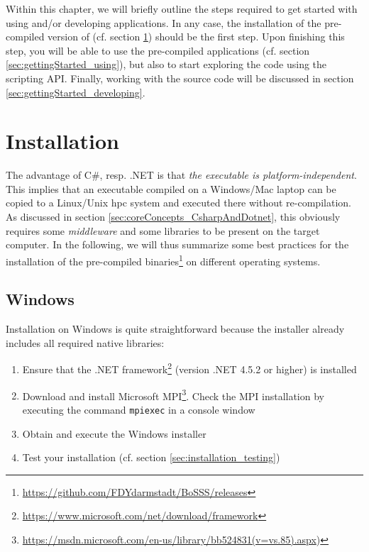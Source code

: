 \documentclass[a4paper,10pt]{report} %
\begin{document}
Within this chapter, we will briefly outline the steps required to get started with using and/or 
developing \BoSSS{} applications. In any case, the installation of the pre-compiled version of \BoSSS{} 
(cf. section \ref{sec:gettingStarted_installation}) should be the first step. Upon finishing this step, 
you will be able to use the pre-compiled \BoSSS{} applications (cf. section \ref{sec:gettingStarted_using}), 
but also to start  exploring the code using the scripting API. Finally, working with the source code will 
be discussed in section \ref{sec:gettingStarted_developing}.

\section{Installation}
\label{sec:gettingStarted_installation}
The advantage of C\#, resp. .NET is that \emph{the executable is platform-independent}. This implies that an executable compiled on a Windows/Mac laptop can be copied to a Linux/Unix \ac{hpc} system and executed there without re-compilation. As discussed in section \ref{sec:coreConcepts_CsharpAndDotnet}, this obviously requires some \emph{middleware} and some libraries to be present on the target computer. In the following, we will thus summarize some best practices for the installation of the pre-compiled \BoSSS{} binaries\footnote{\label{note:relases} \url{https://github.com/FDYdarmstadt/BoSSS/releases}} on different operating systems.

\subsection{Windows}
Installation on Windows is quite straightforward because the \BoSSS{} installer already includes all required native libraries:
\begin{enumerate}
	\item Ensure that the .NET framework\footnote{\url{https://www.microsoft.com/net/download/framework}} (version .NET 4.5.2 or higher) is installed 
	\item Download and install Microsoft MPI\footnote{\url{https://msdn.microsoft.com/en-us/library/bb524831(v=vs.85).aspx})}. Check the MPI installation by executing the command \texttt{mpiexec} in a console window
	\item Obtain and execute the \BoSSS{} Windows installer
	\item Test your installation (cf. section \ref{sec:installation_testing})
\end{enumerate}
\end{document}
